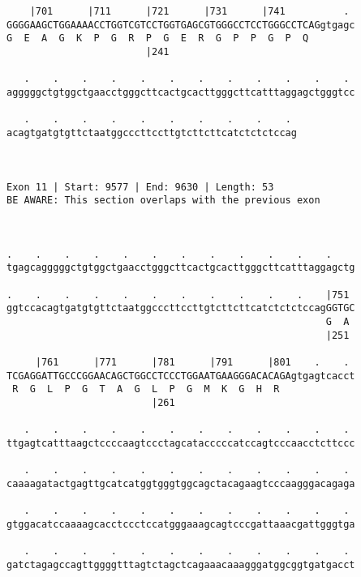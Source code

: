 \documentclass{article}
\begin{document}
\begin{Verbatim}
    |701      |711      |721      |731      |741          . 
GGGGAAGCTGGAAAACCTGGTCGTCCTGGTGAGCGTGGGCCTCCTGGGCCTCAGgtgagc
G  E  A  G  K  P  G  R  P  G  E  R  G  P  P  G  P  Q        
                        |241                                
  
   .    .    .    .    .    .    .    .    .    .    .    . 
agggggctgtggctgaacctgggcttcactgcacttgggcttcatttaggagctgggtcc
                                                            
   .    .    .    .    .    .    .    .    .    . 
acagtgatgtgttctaatggcccttccttgtcttcttcatctctctccag
                                                  
                                                  
 
Exon 11 | Start: 9577 | End: 9630 | Length: 53
BE AWARE: This section overlaps with the previous exon



.    .    .    .    .    .    .    .    .    .    .    .    
tgagcagggggctgtggctgaacctgggcttcactgcacttgggcttcatttaggagctg
                                                            
.    .    .    .    .    .    .    .    .    .    .    |751 
ggtccacagtgatgtgttctaatggcccttccttgtcttcttcatctctctccagGGTGC
                                                       G  A 
                                                       |251 
  
     |761      |771      |781      |791      |801    .    . 
TCGAGGATTGCCCGGAACAGCTGGCCTCCCTGGAATGAAGGGACACAGAgtgagtcacct
 R  G  L  P  G  T  A  G  L  P  G  M  K  G  H  R             
                         |261                               
  
   .    .    .    .    .    .    .    .    .    .    .    . 
ttgagtcatttaagctccccaagtccctagcatacccccatccagtcccaacctcttccc
                                                            
   .    .    .    .    .    .    .    .    .    .    .    . 
caaaagatactgagttgcatcatggtgggtggcagctacagaagtcccaagggacagaga
                                                            
   .    .    .    .    .    .    .    .    .    .    .    . 
gtggacatccaaaagcacctccctccatgggaaagcagtcccgattaaacgattgggtga
                                                            
   .    .    .    .    .    .    .    .    .    .    .    . 
gatctagagccagttggggtttagtctagctcagaaacaaagggatggcggtgatgacct
                                                            

\end{Verbatim}
\end{document}
